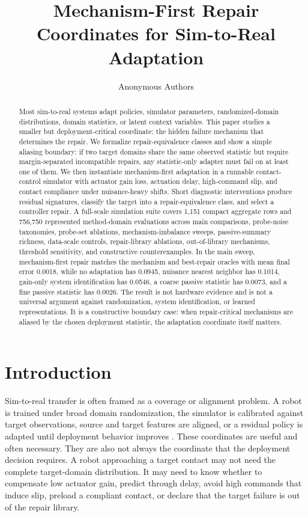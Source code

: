 \documentclass{article}
\title{Mechanism-First Repair Coordinates for Sim-to-Real Adaptation}
\author{Anonymous Authors}
\begin{document}
\maketitle

\begin{abstract}
Most sim-to-real systems adapt policies, simulator parameters, randomized-domain
distributions, domain statistics, or latent context variables. This paper studies
a smaller but deployment-critical coordinate: the hidden failure mechanism that
determines the repair. We formalize repair-equivalence classes and show a simple
aliasing boundary: if two target domains share the same observed statistic but
require margin-separated incompatible repairs, any statistic-only adapter must
fail on at least one of them. We then instantiate mechanism-first adaptation in a
runnable contact-control simulator with actuator gain loss, actuation delay,
high-command slip, and contact compliance under nuisance-heavy shifts. Short
diagnostic interventions produce residual signatures, classify the target into a
repair-equivalence class, and select a controller repair. A full-scale
simulation suite covers 1,151 compact aggregate rows and 756,750 represented
method-domain evaluations across main comparisons, probe-noise taxonomies,
probe-set ablations, mechanism-imbalance sweeps, passive-summary richness,
data-scale controls, repair-library ablations, out-of-library mechanisms,
threshold sensitivity, and constructive counterexamples. In the main sweep,
mechanism-first repair matches the mechanism and best-repair oracles with mean
final error 0.0018, while no adaptation has 0.0945, nuisance nearest neighbor has
0.1014, gain-only system identification has 0.0546, a coarse passive statistic
has 0.0073, and a fine passive statistic has 0.0026. The result is not hardware
evidence and is not a universal argument against randomization, system
identification, or learned representations. It is a constructive boundary case:
when repair-critical mechanisms are aliased by the chosen deployment statistic,
the adaptation coordinate itself matters.
\end{abstract}

\section{Introduction}

Sim-to-real transfer is often framed as a coverage or alignment problem. A robot
is trained under broad domain randomization, the simulator is calibrated against
target observations, source and target features are aligned, or a residual policy
is adapted until deployment behavior improves \citep{tobin2017domain,
peng2018dynamics,tan2018agile,yu2017uposi,chebotar2019closing,
muratore2022robot}. These coordinates are useful and often necessary. They are
also not always the coordinate that the deployment decision requires. A robot
approaching a target contact may not need the complete target-domain
distribution. It may need to know whether to compensate low actuator gain,
predict through delay, avoid high commands that induce slip, preload a compliant
contact, or declare that the target failure is out of the repair library.
\end{document}
